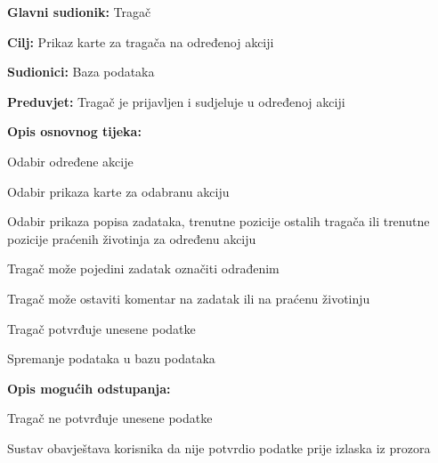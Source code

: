 					
					\noindent {}
					\begin{packed_item}
						
						\item \textbf{Glavni sudionik: }Tragač
						\item  \textbf{Cilj:} Prikaz karte za tragača na određenoj akciji
						\item  \textbf{Sudionici:} Baza podataka
						\item  \textbf{Preduvjet:} Tragač je prijavljen i sudjeluje u određenoj akciji
						\item  \textbf{Opis osnovnog tijeka:}
						
						\item[] \begin{packed_enum}
							
							\item Odabir određene akcije
							\item Odabir prikaza karte za odabranu akciju
							\item Odabir prikaza popisa zadataka, trenutne pozicije ostalih tragača ili trenutne pozicije praćenih životinja za određenu akciju
							\item Tragač može pojedini zadatak označiti odrađenim
							\item Tragač može ostaviti komentar na zadatak ili na praćenu životinju
							\item Tragač potvrđuje unesene podatke
							\item Spremanje podataka u bazu podataka
						\end{packed_enum}
						
						\item  \textbf{Opis mogućih odstupanja:}
						
						\item[] \begin{packed_item}
							
							
							\item[5.a] Tragač ne potvrđuje unesene podatke
							\item[] \begin{packed_enum}
								
								\item Sustav obavještava korisnika da nije potvrdio podatke prije izlaska iz prozora
								
							\end{packed_enum}
							
						\end{packed_item}
						
					\end{packed_item}
					
